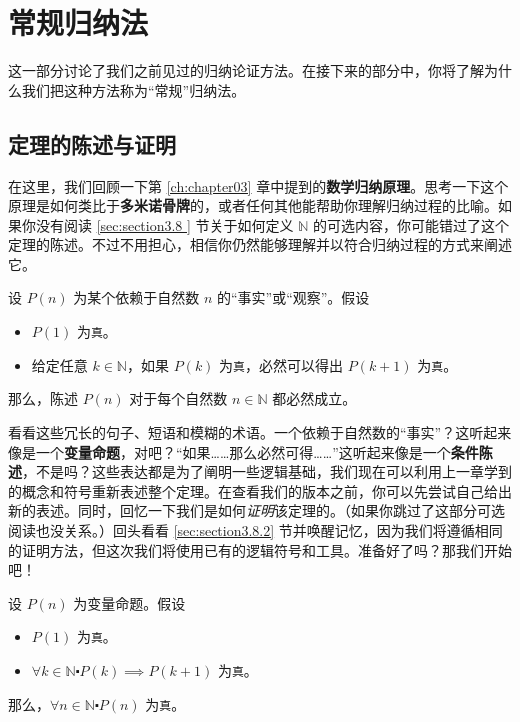 \section{常规归纳法}

这一部分讨论了我们之前见过的归纳论证方法。在接下来的部分中，你将了解为什么我们把这种方法称为``常规''归纳法。

\subsection{定理的陈述与证明}

在这里，我们回顾一下第 \ref{ch:chapter03} 章中提到的\textbf{数学归纳原理}。思考一下这个原理是如何类比于\textbf{多米诺骨牌}的，或者任何其他能帮助你理解归纳过程的比喻。如果你没有阅读 \ref{sec:section3.8 } 节关于如何定义 $\mathbb{N}$ 的可选内容，你可能错过了这个定理的陈述。不过不用担心，相信你仍然能够理解并以符合归纳过程的方式来阐述它。

\begin{theorem}[数学归纳原理]
    设 $P(n)$ 为某个依赖于自然数 $n$ 的``事实''或``观察''。假设
    \begin{itemize}
        \item $P(1)$ 为\verb|真|。
        \item 给定任意 $k \in \mathbb{N}$，如果 $P(k)$ 为\verb|真|，必然可以得出 $P(k+1)$ 为\verb|真|。
    \end{itemize}
    那么，陈述 $P(n)$ 对于每个自然数 $n \in \mathbb{N}$ 都必然成立。
\end{theorem}

看看这些冗长的句子、短语和模糊的术语。一个依赖于自然数的``事实''？这听起来像是一个\textbf{变量命题}，对吧？``如果……那么必然可得……''这听起来像是一个\textbf{条件陈述}，不是吗？这些表达都是为了阐明一些逻辑基础，我们现在可以利用上一章学到的概念和符号重新表述整个定理。在查看我们的版本之前，你可以先尝试自己给出新的表述。同时，回忆一下我们是如何\emph{证明}该定理的。（如果你跳过了这部分可选阅读也没关系。）回头看看 \ref{sec:section3.8.2} 节并唤醒记忆，因为我们将遵循相同的证明方法，但这次我们将使用已有的逻辑符号和工具。准备好了吗？那我们开始吧！

\begin{theorem}[数学归纳原理]
    设 $P(n)$ 为变量命题。假设
    \begin{itemize}
        \item $P(1)$ 为\verb|真|。
        \item $\forall k \in \mathbb{N} \centerdot P(k) \implies P(k+1)$ 为\verb|真|。
    \end{itemize}
    那么，$\forall n \in \mathbb{N} \centerdot P(n)$ 为\verb|真|。
\end{theorem}

